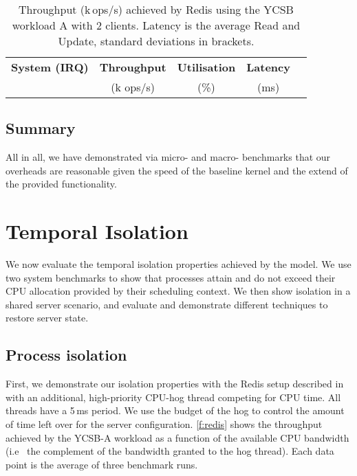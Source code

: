 \begin{table}[t]\centering
      \begin{tabular}{|c|c|c|c|c|}
        \hline
        \textbf{System (IRQ)}  & \textbf{Throughput} & \textbf{Utilisation} &  \textbf{Latency} \\
                               & (k ops/s)     &  (\%)            &   (ms)            \\
        \hline
      
    \end{tabular}
    \caption{Throughput (k\,ops/s) achieved by Redis using the YCSB
      workload A with 2 clients.  Latency is the average Read and Update,
      standard deviations in brackets.}
    \label{t:redis}
\end{table}

\subsection{Summary}

All in all, we have demonstrated via micro- and macro- benchmarks that our overheads are
reasonable given the speed of the baseline kernel and the extend of the provided
functionality. 
\clearpage

\section{Temporal Isolation}

We now evaluate the temporal isolation properties achieved by the model. We use
two system benchmarks to show that processes attain and do not exceed their
CPU allocation provided by their scheduling context. We then show isolation in a shared
server scenario, and evaluate and demonstrate different techniques to restore server state.

\subsection{Process isolation} 

First, we demonstrate our isolation properties with the Redis setup described in
 with an additional, high-priority CPU-hog thread
competing for \gls{CPU} time.  All threads have a
5\,ms period. We use the budget of the hog to control the amount of time left over
for the server configuration. \autoref{f:redis} shows the throughput
achieved by the YCSB-A workload as a function of the available CPU
bandwidth (i.e \ the complement of the bandwidth granted to the hog
thread). Each data point is the average of three benchmark runs.

